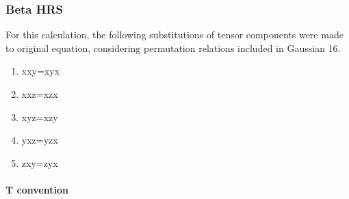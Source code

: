 \documentclass{article}
\begin{document}
	\subsubsection{Beta HRS}
	For this calculation, the following substitutions of tensor components were made to original equation, considering permutation relations included in Gaussian 16.
	\begin{enumerate}
		\item xxy=xyx
		\item xxz=xzx
		\item xyz=xzy
		\item yxz=yzx
		\item zxy=zyx
	\end{enumerate}
	
	\paragraph{T convention}
\end{document}
